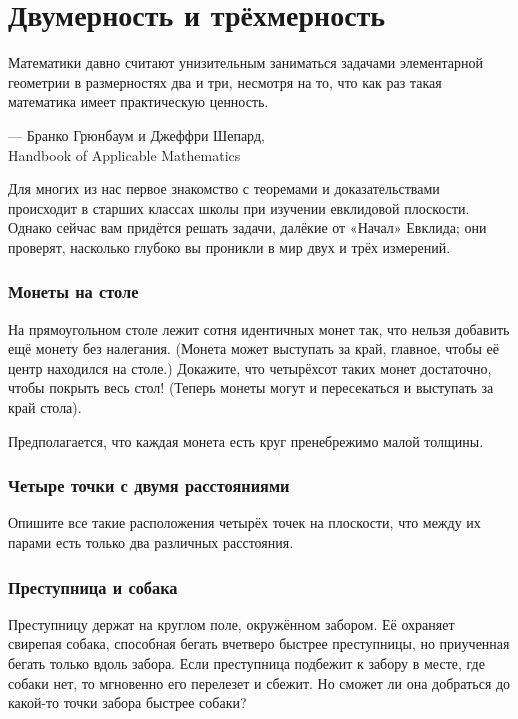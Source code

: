 \chapter{Двумерность и трёхмерность}


\setlength{\epigraphwidth}{.83\textwidth}
\epigraph{Математики давно считают унизительным заниматься задачами элементарной геометрии в размерностях два и три, несмотря на то, что как раз такая математика имеет практическую ценность.}{--- Бранко Грюнбаум и Джеффри Шепард,\\ Handbook of Applicable Mathematics}

Для многих из нас первое знакомство с теоремами и доказательствами
происходит в старших классах школы при изучении евклидовой плоскости.
Однако сейчас вам придётся решать задачи, далёкие от «Начал» Евклида;
они проверят, насколько глубоко вы проникли в мир двух и трёх измерений.

\subsection*{Монеты на столе}\label{Монеты на столе}

На прямоугольном столе лежит сотня идентичных монет так, что нельзя добавить ещё монету без налегания.
(Монета может выступать за край, главное, чтобы её центр находился на столе.)
Докажите, что четырёхсот таких монет достаточно, чтобы покрыть весь стол!
(Теперь монеты могут и пересекаться и выступать за край стола).

Предполагается, что каждая монета есть круг пренебрежимо малой толщины.

\subsection*{Четыре точки с двумя расстояниями}

Опишите все такие расположения четырёх точек на плоскости, что между их парами есть только два различных расстояния.

\subsection*{Преступница и собака}

Преступницу держат на круглом  поле, окружённом забором.
Её охраняет свирепая собака, способная бегать вчетверо быстрее преступницы, но приученная бегать только вдоль забора.
Если преступница подбежит к забору в месте, где собаки нет, то мгновенно его перелезет и сбежит.
Но сможет ли она добраться до какой-то точки забора быстрее собаки?

